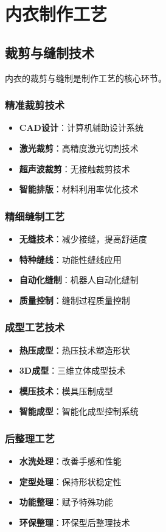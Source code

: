 \documentclass[12pt,UTF8]{ctexbook}
\begin{document}
\chapter{内衣制作工艺}
\section{裁剪与缝制技术}
内衣的裁剪与缝制是制作工艺的核心环节。

\subsection{精准裁剪技术}
\begin{itemize}[leftmargin=2cm]
	\item \textbf{CAD设计}：计算机辅助设计系统
	\item \textbf{激光裁剪}：高精度激光切割技术
	\item \textbf{超声波裁剪}：无接触裁剪技术
	\item \textbf{智能排版}：材料利用率优化技术
\end{itemize}

\subsection{精细缝制工艺}
\begin{itemize}[leftmargin=2cm]
	\item \textbf{无缝技术}：减少接缝，提高舒适度
	\item \textbf{特种缝线}：功能性缝线应用
	\item \textbf{自动化缝制}：机器人自动化缝制
	\item \textbf{质量控制}：缝制过程质量控制
\end{itemize}

\subsection{成型工艺技术}
\begin{itemize}[leftmargin=2cm]
	\item \textbf{热压成型}：热压技术塑造形状
	\item \textbf{3D成型}：三维立体成型技术
	\item \textbf{模压技术}：模具压制成型
	\item \textbf{智能成型}：智能化成型控制系统
\end{itemize}

\subsection{后整理工艺}
\begin{itemize}[leftmargin=2cm]
	\item \textbf{水洗处理}：改善手感和性能
	\item \textbf{定型处理}：保持形状稳定性
	\item \textbf{功能整理}：赋予特殊功能
	\item \textbf{环保整理}：环保型后整理技术
\end{itemize}
\end{document}
